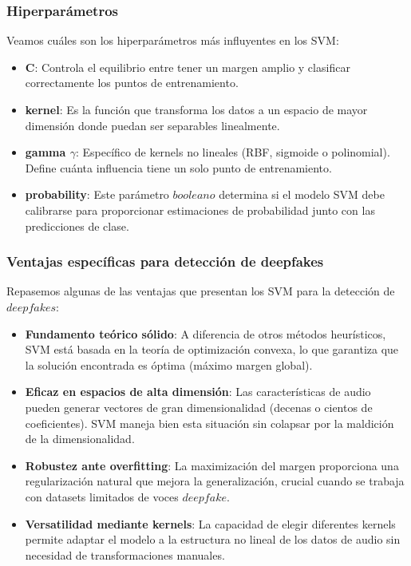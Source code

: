 \subsubsection*{Hiperparámetros}

Veamos cuáles son los hiperparámetros más influyentes en los SVM:

\begin{itemize}
    \item \textbf{C}: Controla el equilibrio entre tener un margen amplio y clasificar correctamente los puntos de entrenamiento.
    
    \item \textbf{kernel}: Es la función que transforma los datos a un espacio de mayor dimensión donde puedan ser separables linealmente.
    
    \item \textbf{gamma \(\gamma\)}: Específico de kernels no lineales (RBF, sigmoide o polinomial). Define cuánta influencia tiene un solo punto de entrenamiento.
    
    \item \textbf{probability}: Este parámetro $booleano$ determina si el modelo SVM debe calibrarse para proporcionar estimaciones de probabilidad junto con las predicciones de clase.
\end{itemize}

\subsubsection*{Ventajas específicas para detección de deepfakes}

Repasemos algunas de las ventajas que presentan los SVM para la detección de $deepfakes$:

\begin{itemize}
    \item \textbf{Fundamento teórico sólido}: A diferencia de otros métodos heurísticos, SVM está basada en la teoría de optimización convexa, lo que garantiza que la solución encontrada es óptima (máximo margen global).
    
    \item \textbf{Eficaz en espacios de alta dimensión}: Las características de audio pueden generar vectores de gran dimensionalidad (decenas o cientos de coeficientes). SVM maneja bien esta situación sin colapsar por la maldición de la dimensionalidad.
    
    \item \textbf{Robustez ante overfitting}: La maximización del margen proporciona una regularización natural que mejora la generalización, crucial cuando se trabaja con datasets limitados de voces $deepfake$.
    
    \item \textbf{Versatilidad mediante kernels}: La capacidad de elegir diferentes kernels permite adaptar el modelo a la estructura no lineal de los datos de audio sin necesidad de transformaciones manuales.
\end{itemize}